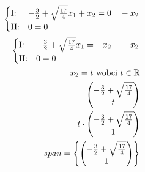 \begin{align*}
    \begin{cases}
        \text{I:\@} & -\frac{3}{2} + \sqrt{\frac{17}{4}}x_1 + x_2 = 0 \quad -x_2 \\
        \text{II:\@} & 0 = 0
    \end{cases} \\
    \begin{cases}
        \text{I:\@} & -\frac{3}{2} + \sqrt{\frac{17}{4}}x_1 = -x_2 \quad -x_2 \\
        \text{II:\@} & 0 = 0
    \end{cases} \\
    x_2 = t \text{ wobei } t \in \mathbb{R} \\
    \begin{pmatrix}
        -\frac{3}{2} + \sqrt{\frac{17}{4}} \\ t
    \end{pmatrix} \\
    t \cdot \begin{pmatrix}
        -\frac{3}{2} + \sqrt{\frac{17}{4}} \\ 1
    \end{pmatrix} \\
    span = \left\{\begin{pmatrix}
        -\frac{3}{2} + \sqrt{\frac{17}{4}} \\ 1
    \end{pmatrix}\right\}
\end{align*}